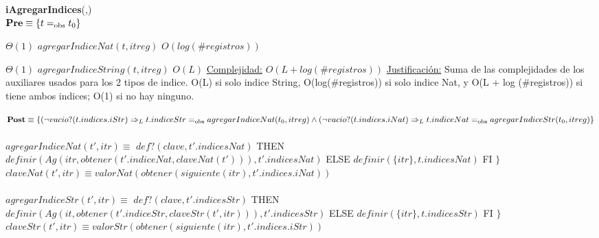 \begin{algorithm}[H]{\textbf{iAgregarIndices}(,)}
	{\\ $\textbf{Pre} \equiv \{t =_{\mathrm{obs}} t_0\}$}
	\begin{algorithmic}[1]
		 \Comment $\Theta(1)$
			\State $agregarIndiceNat(t,itreg)$ \Comment $O(log (\#registros))$
		\EndIf

		 \Comment $\Theta(1)$
			\State $agregarIndiceString(t,itreg)$ \Comment $O(L)$
		\EndIf
		\medskip
		\Statex \underline{Complejidad:} $O(L + log (\#registros))$
		\Statex \underline{Justificación:} Suma de las complejidades de los auxiliares usados para los 2 tipos de indice. O(L) si solo indice String, O(log(\#registros)) si solo indice Nat, y O(L + log (\#registros)) si tiene ambos indices; O(1) si no hay ninguno.
	\end{algorithmic}
	{$\textbf{Post} \equiv \{(\neg vacio?(t.indices.iStr) \Rightarrow_L t.indiceStr =_{\mathrm{obs}} agregarIndiceNat(t_0,itreg) \land \\
							 (\neg vacio?(t.indices.iNat) \Rightarrow_L t.indiceNat =_{\mathrm{obs}} agregarIndiceStr(t_0,itreg) \}$}
	\\ \\
	{$agregarIndiceNat(t',itr) \equiv$ \IF $def?(clave,t'.indicesNat)$ THEN $definir(Ag(itr,obtener(t'.indiceNat,claveNat(t'))),t'.indicesNat)$ ELSE $definir(\{itr\},t.indicesNat)$ FI $\}$}\\
	{$claveNat(t',itr) \equiv valorNat(obtener(siguiente(itr),t'.indices.iNat))$}\\ \\

	{$agregarIndiceStr(t',itr) \equiv$ \IF $def?(clave,t'.indicesStr)$ THEN $definir(Ag(it,obtener(t'.indiceStr,claveStr(t',itr))),t'.indicesStr)$ ELSE $definir(\{itr\},t.indicesStr	)$ FI $\}$}\\
	{$claveStr(t',itr) \equiv valorStr(obtener(siguiente(itr),t'.indices.iStr))$}\\
		
	
\end{algorithm}

